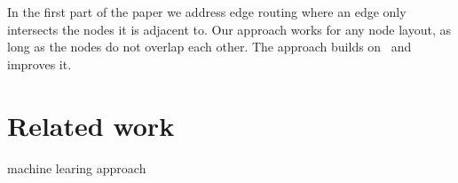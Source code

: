 \documentclass{gd-llncs}
\begin{document}
In the first part of the paper we address edge routing where an edge only intersects the nodes it is adjacent to. Our approach works for any node layout, as long as the nodes do not overlap each other. The approach builds on~\cite{dwyer2010fast} and improves it.

\section*{Related work}
\cite{graphviz}

\cite{regraph}

\cite{skewed}

\cite{circos}

\cite{gibson2013survey}

machine learing approach
\cite{kwon2017would}

\cite{lin2013interactive}

\cite{cosmograph}
\end{document}
